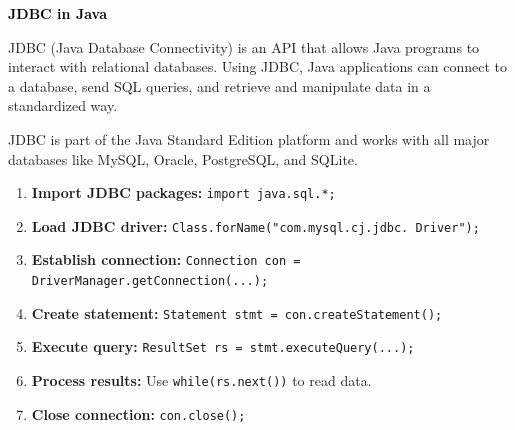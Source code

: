 \documentclass{article}
\begin{document}
\newpage
\begin{center}
    \Huge\bfseries \textcolor{black}{JDBC in Java}
\end{center}
\vspace{0.5cm}

\noindent
JDBC (Java Database Connectivity) is an API that allows Java programs to interact with relational databases. Using JDBC, Java applications can connect to a database, send SQL queries, and retrieve and manipulate data in a standardized way.

JDBC is part of the Java Standard Edition platform and works with all major databases like MySQL, Oracle, PostgreSQL, and SQLite.

\vspace{0.5cm}

\begin{tcolorbox}[colback=black!5!white,colframe=black,title=\textbf{Steps to Use JDBC in Java}]
\begin{enumerate}[leftmargin=2em]
    \item \textbf{Import JDBC packages:} \texttt{import java.sql.*;}
    \item \textbf{Load JDBC driver:} \texttt{Class.forName("com.mysql.cj.jdbc. Driver");}
    \item \textbf{Establish connection:} \texttt{Connection con = DriverManager.getConnection(...);}
    \item \textbf{Create statement:} \texttt{Statement stmt = con.createStatement();}
    \item \textbf{Execute query:} \texttt{ResultSet rs = stmt.executeQuery(...);}
    \item \textbf{Process results:} Use \texttt{while(rs.next())} to read data.
    \item \textbf{Close connection:} \texttt{con.close();}
\end{enumerate}
\end{tcolorbox}

\vspace{0.5cm}

\newpage
\end{document}
